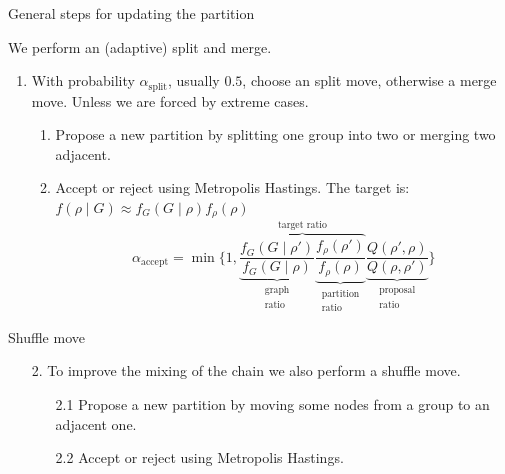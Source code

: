 \begin{frame}{General steps for updating the partition}
    
    We perform an (adaptive) \alert{split and merge}.

    \begin{enumerate}
        \item With probability $\alpha_{\text{split}}$, usually $0.5$, choose an \alert{split move}, otherwise a \alert{merge move}. Unless we are forced by extreme cases.
        \begin{enumerate}
            \item Propose a new partition by splitting one group into two or merging two adjacent.
            \item Accept or reject using\vphantom{un banale} Metropolis Hastings. The target is:
            $f(\rho \mid G) \approx f_G(G \mid \rho) f_{\rho}(\rho)$
            \[
                \alpha_{\text{accept}} = \min
                \bigg\{1,
                \overbrace{
                \underbrace{\frac{f_G\left(G \mid \rho'\right)}{f_G(G \mid \rho)}}_{\substack{\text{graph}\\\text{ratio}}}
                \underbrace{\frac{f_\rho\left(\rho'\right)}{f_\rho(\rho)}}_{\substack{\text{partition}\\\text{ratio}}}
                }^{\text{target ratio}}
                \underbrace{\frac{Q(\rho',\rho)}{Q(\rho,\rho')}}_{\substack{\text{proposal}\\\text{ratio}}}
                \bigg\}
            \]
        \end{enumerate}
        
    \end{enumerate}

\end{frame}

\begin{frame}{Shuffle move}
    \begin{enumerate}
        \item[2.] To improve the mixing of the chain we also perform a \alert{shuffle move}.
            \begin{enumerate}
                \item[2.1] Propose a new partition by moving some nodes from a group to an adjacent one.
                \item[2.2] Accept or reject using Metropolis Hastings.
            \end{enumerate}
    \end{enumerate}

\end{frame}

